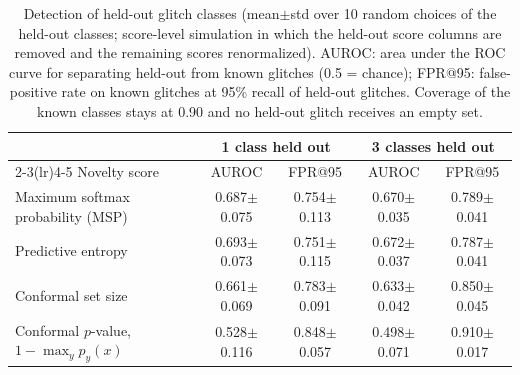 \begin{table}[!htbp]
\caption{Detection of held-out glitch classes (mean$\pm$std over 10 random choices of the held-out classes; score-level
simulation in which the held-out score columns are removed and the remaining scores renormalized). AUROC: area under the ROC
curve for separating held-out from known glitches (0.5 = chance); FPR@95: false-positive rate on known glitches at 95\% recall
of held-out glitches. Coverage of the known classes stays at 0.90 and no held-out glitch receives an empty set.}\label{tab:e3}
\centering\footnotesize\setlength{\tabcolsep}{4pt}
\begin{tabular}{lcccc}\toprule
 & \multicolumn{2}{c}{1 class held out} & \multicolumn{2}{c}{3 classes held out}\\\cmidrule(lr){2-3}\cmidrule(lr){4-5}
Novelty score & AUROC & FPR@95 & AUROC & FPR@95\\\midrule
Maximum softmax probability (MSP) & 0.687$\pm$0.075 & 0.754$\pm$0.113 & 0.670$\pm$0.035 & 0.789$\pm$0.041\\
Predictive entropy & 0.693$\pm$0.073 & 0.751$\pm$0.115 & 0.672$\pm$0.037 & 0.787$\pm$0.041\\
Conformal set size & 0.661$\pm$0.069 & 0.783$\pm$0.091 & 0.633$\pm$0.042 & 0.850$\pm$0.045\\
Conformal $p$-value, $1-\max_y p_y(x)$ & 0.528$\pm$0.116 & 0.848$\pm$0.057 & 0.498$\pm$0.071 & 0.910$\pm$0.017\\
\bottomrule
\end{tabular}
\end{table}
